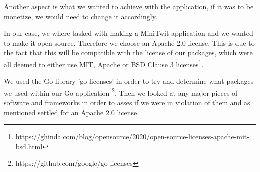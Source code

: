 Another aspect is what we wanted to achieve with the application, if it was to be monetize, we would need to change it accordingly.

In our case, we where tasked with making a MiniTwit application and we wanted to make it open source. 
Therefore we choose an Apache 2.0 license. This is due to the fact that this will be compatible with the license of our packages, which were all deemed to either use MIT, Apache or BSD Clause 3 licenses\footnote{https://ghinda.com/blog/opensource/2020/open-source-licenses-apache-mit-bsd.html}. 

We used the Go library 'go-licenses' in order to try and determine what packages we used within our Go application \footnote{https://github.com/google/go-licenses}. 
Then we looked at any major pieces of software and frameworks in order to asses if we were in violation of them and as mentioned settled for an Apache 2.0 license.